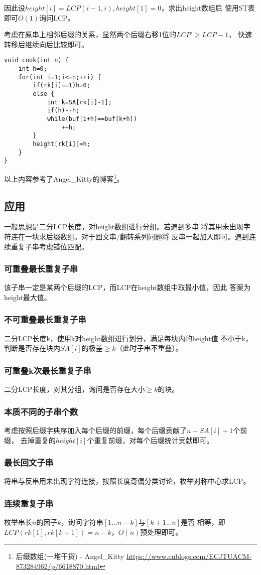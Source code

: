 因此设$height[i]=LCP(i-1,i),height[1]=0$，求出height数组后
使用ST表即可$O(1)$询问LCP。

考虑在原串上相邻后缀的关系，显然两个后缀右移1位的$LCP'\geq LCP-1$，
快速转移后继续向后比较即可。

\begin{lstlisting}
void cook(int n) {
    int h=0;
    for(int i=1;i<=n;++i) {
        if(rk[i]==1)h=0;
        else {
            int k=SA[rk[i]-1];
            if(h)--h;
            while(buf[i+h]==buf[k+h])
                ++h;
        }
        height[rk[i]]=h;
    }
}
\end{lstlisting}
以上内容参考了Angel\_Kitty的博客\footnote{后缀数组(一堆干货) - Angel\_Kitty
    \url{https://www.cnblogs.com/ECJTUACM-873284962/p/6618870.html}
}。
\subsection{应用}
一般思想是二分LCP长度，对height数组进行分组。若遇到多串
将其用未出现字符连在一块求后缀数组。对于回文串/翻转系列问题将
反串一起加入即可。遇到连续重复子串考虑错位匹配。
\subsubsection{可重叠最长重复子串}
该子串一定是某两个后缀的LCP，而LCP在height数组中取最小值，因此
答案为height最大值。
\subsubsection{不可重叠最长重复子串}
二分LCP长度k，使用k对height数组进行划分，满足每块内的height值
不小于k，判断是否存在块内$SA[i]$的极差$\geq k$（此时子串不重叠）。
\subsubsection{可重叠k次最长重复子串}
二分LCP长度，对其分组，询问是否存在大小$\geq k$的块。
\subsubsection{本质不同的子串个数}
考虑按照后缀字典序加入每个后缀的前缀，每个后缀贡献了$n-SA[i]+1$个前缀，
去掉重复的$height[i]$个重复前缀，对每个后缀统计贡献即可。
\subsubsection{最长回文子串}
将串与反串用未出现字符连接，按照长度奇偶分类讨论，枚举对称中心求LCP。
\subsubsection{连续重复子串}
枚举串长$n$的因子$k$，询问字符串$[1\ldots n-k]$与$[k+1\ldots n]$是否
相等，即$LCP(rk[1],rk[k+1])=n-k$，$O(n)$预处理即可。
